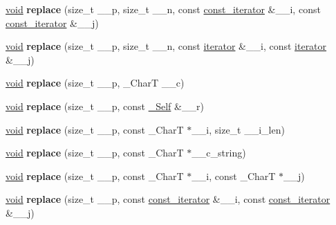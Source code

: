 \begin{DoxyCompactItemize}
\item 
\mbox{\label{classrope_aa6cbe03c6df55cffb0f3befb03ca2931}} 
\hyperlink{interfacevoid}{void} {\bfseries replace} (size\+\_\+t \+\_\+\+\_\+p, size\+\_\+t \+\_\+\+\_\+n, const \hyperlink{class___rope__const__iterator}{const\+\_\+iterator} \&\+\_\+\+\_\+i, const \hyperlink{class___rope__const__iterator}{const\+\_\+iterator} \&\+\_\+\+\_\+j)
\item 
\mbox{\label{classrope_aa11a4b1f7e2fd35d4d0e50819226067a}} 
\hyperlink{interfacevoid}{void} {\bfseries replace} (size\+\_\+t \+\_\+\+\_\+p, size\+\_\+t \+\_\+\+\_\+n, const \hyperlink{class___rope__iterator}{iterator} \&\+\_\+\+\_\+i, const \hyperlink{class___rope__iterator}{iterator} \&\+\_\+\+\_\+j)
\item 
\mbox{\label{classrope_ae4d8c577a8b78a542998abb54a41dc46}} 
\hyperlink{interfacevoid}{void} {\bfseries replace} (size\+\_\+t \+\_\+\+\_\+p, \+\_\+\+CharT \+\_\+\+\_\+c)
\item 
\mbox{\label{classrope_ae42111470c520e96b84299eff1b61cbf}} 
\hyperlink{interfacevoid}{void} {\bfseries replace} (size\+\_\+t \+\_\+\+\_\+p, const \hyperlink{classrope}{\+\_\+\+Self} \&\+\_\+\+\_\+r)
\item 
\mbox{\label{classrope_a86c45c966fc136191719999478c5a6ab}} 
\hyperlink{interfacevoid}{void} {\bfseries replace} (size\+\_\+t \+\_\+\+\_\+p, const \+\_\+\+CharT $\ast$\+\_\+\+\_\+i, size\+\_\+t \+\_\+\+\_\+i\+\_\+len)
\item 
\mbox{\label{classrope_aa64d6b38b2063fccb037fe3e4370f048}} 
\hyperlink{interfacevoid}{void} {\bfseries replace} (size\+\_\+t \+\_\+\+\_\+p, const \+\_\+\+CharT $\ast$\+\_\+\+\_\+c\+\_\+string)
\item 
\mbox{\label{classrope_a025fa0e891853f6d210faa53555bf571}} 
\hyperlink{interfacevoid}{void} {\bfseries replace} (size\+\_\+t \+\_\+\+\_\+p, const \+\_\+\+CharT $\ast$\+\_\+\+\_\+i, const \+\_\+\+CharT $\ast$\+\_\+\+\_\+j)
\item 
\mbox{\label{classrope_ae49b3afe014c9dff92d96ce2066c486e}} 
\hyperlink{interfacevoid}{void} {\bfseries replace} (size\+\_\+t \+\_\+\+\_\+p, const \hyperlink{class___rope__const__iterator}{const\+\_\+iterator} \&\+\_\+\+\_\+i, const \hyperlink{class___rope__const__iterator}{const\+\_\+iterator} \&\+\_\+\+\_\+j)

\end{DoxyCompactItemize}
